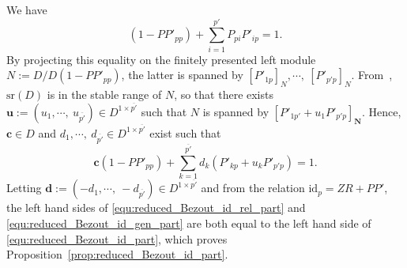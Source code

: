 \documentclass{ifacconf}
\newcommand\g[1]{\textbf{#1}}
\newcommand\id[1]{\text{id}_{#1}}
\newcommand\sr{\text{sr}(D)}
\begin{document}
\begin{pf}
  We have
  \[
  \left(1-PP'_{pp}\right)+\sum_{i=1}^{p'}P_{pi}P'_{ip}=1.
  \]
  By projecting this equality on the finitely presented left module
  $N:=D/ D\left(1-PP'_{pp}\right)$, the latter is spanned by
  $[P'_{1p}]_{N},\cdots,\ [P'_{p'p}]_{N}$. From~\cite{MCRo:01}, $\sr$ is
  in the stable range of $N$, so that there exists $\g{u}:=\left(u_1,
  \cdots,\ u_{\overline{p'}}\right)\in D^{1\times\overline{p'}}$ such
  that $N$ is spanned by $[P'_{1p'}+u_1P'_{p'p}]_{\g{N}}$. Hence,
  $\g{c}\in D$ and
  $d_1,\cdots,\ d_{\overline{p'}}\in D^{1\times\overline{p'}}$ exist such
  that
  \begin{equation}\label{equ:reduced_Bezout_id_part}
    \g{c}\left(1-PP'_{pp}\right)+\sum_{k=1}^{\overline{p'}}d_k\left(P'_{k
      p}+u_kP'_{p'p}\right)=1.
  \end{equation}
  Letting $\g{d}:=\left( -d_1,\cdots,\ -d_{\overline{p'}}\right)\in D^{1
    \times\overline{p'}}$ and from the relation $\id{p}=ZR+PP'$, the left
  hand sides of \eqref{equ:reduced_Bezout_id_rel_part} and
  \eqref{equ:reduced_Bezout_id_gen_part} are both equal to the left
  hand side of \eqref{equ:reduced_Bezout_id_part}, which proves
  Proposition~\ref{prop:reduced_Bezout_id_part}.
  \end{pf}

\medskip
\end{document}
